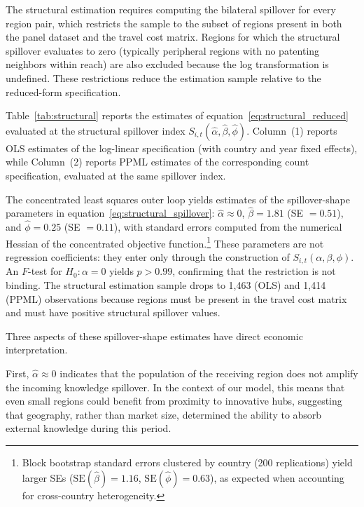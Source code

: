 \documentclass[letterpaper,12pt,leqno]{article}
\begin{document}
The structural estimation requires computing the bilateral spillover for every region pair, which restricts the sample to the subset of regions present in both the panel dataset and the travel cost matrix. Regions for which the structural spillover evaluates to zero (typically peripheral regions with no patenting neighbors within reach) are also excluded because the log transformation is undefined. These restrictions reduce the estimation sample relative to the reduced-form specification.



Table~\ref{tab:structural} reports the estimates of equation~\eqref{eq:structural_reduced} evaluated at the structural spillover index \(S_{i,t}(\hat{\alpha}, \hat{\beta}, \hat{\phi})\). Column~(1) reports OLS estimates of the log-linear specification (with country and year fixed effects), while Column~(2) reports PPML estimates of the corresponding count specification, evaluated at the same spillover index.

The concentrated least squares outer loop yields estimates of the spillover-shape parameters in equation~\eqref{eq:structural_spillover}: \(\hat{\alpha} \approx 0\), \(\hat{\beta} = 1.81\) (SE \(= 0.51\)), and \(\hat{\phi} = 0.25\) (SE \(= 0.11\)), with standard errors computed from the numerical Hessian of the concentrated objective function.\footnote{Block bootstrap standard errors clustered by country (200 replications) yield larger SEs (\(\text{SE}(\hat{\beta}) = 1.16\), \(\text{SE}(\hat{\phi}) = 0.63\)), as expected when accounting for cross-country heterogeneity.} These parameters are not regression coefficients: they enter only through the construction of \(S_{i,t}(\alpha,\beta,\phi)\). An \(F\)-test for \(H_0: \alpha = 0\) yields \(p > 0.99\), confirming that the restriction is not binding. The structural estimation sample drops to 1,463 (OLS) and 1,414 (PPML) observations because regions must be present in the travel cost matrix and must have positive structural spillover values.

Three aspects of these spillover-shape estimates have direct economic interpretation.

First, \(\hat{\alpha} \approx 0\) indicates that the population of the receiving region does not amplify the incoming knowledge spillover. In the context of our model, this means that even small regions could benefit from proximity to innovative hubs, suggesting that geography, rather than market size, determined the ability to absorb external knowledge during this period.
\end{document}
